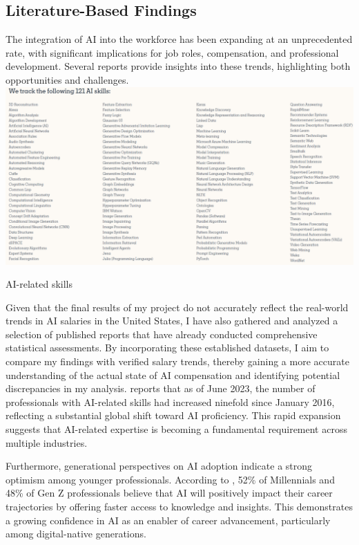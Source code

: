 \documentclass[12pt,a4paper]{article}
\begin{document}
\begin{multicols}{2}
\subsection{Literature-Based Findings}

The integration of AI into the workforce has been expanding at an unprecedented rate, with significant implications for job roles, compensation, and professional development. Several reports provide insights into these trends, highlighting both opportunities and challenges.
\includegraphics[width=\linewidth]{AI_skills.jpg}
\caption{AI-related skills}
\label{fig:AI_skills}

Given that the final results of my project do not accurately reflect the real-world trends in AI salaries in the United States, I have also gathered and analyzed a selection of published reports that have already conducted comprehensive statistical assessments. By incorporating these established datasets, I aim to compare my findings with verified salary trends, thereby gaining a more accurate understanding of the actual state of AI compensation and identifying potential discrepancies in my analysis.
\cite{linkedin2023future} reports that as of June 2023, the number of professionals with AI-related skills had increased ninefold since January 2016, reflecting a substantial global shift toward AI proficiency. This rapid expansion suggests that AI-related expertise is becoming a fundamental requirement across multiple industries.

Furthermore, generational perspectives on AI adoption indicate a strong optimism among younger professionals. According to \cite{linkedin2023future}, 52\% of Millennials and 48\% of Gen Z professionals believe that AI will positively impact their career trajectories by offering faster access to knowledge and insights. This demonstrates a growing confidence in AI as an enabler of career advancement, particularly among digital-native generations.


\end{multicols}
\end{document}

